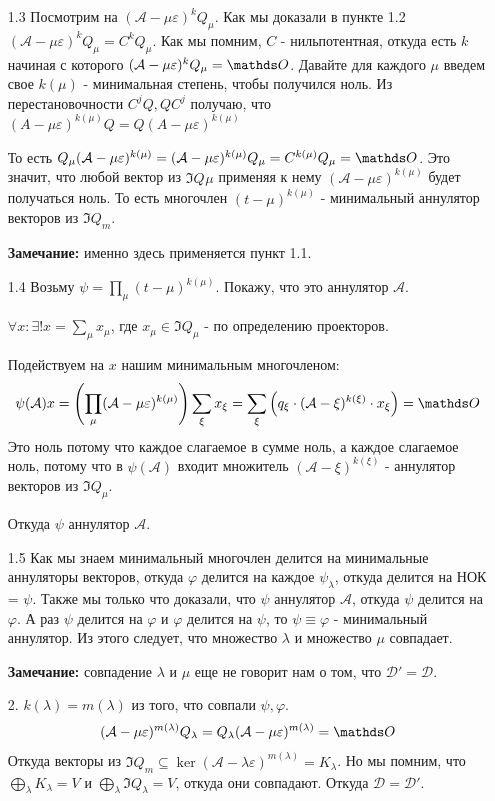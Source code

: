 \begin{enumerate}
    \item[1.3] Посмотрим на $(\mathcal{A}-\mu \varepsilon)^k Q_{\mu}$. Как мы доказали в пункте 1.2 $(\mathcal{A}-\mu \varepsilon)^k Q_{\mu}= C^{k}Q_{\mu}$. Как мы помним, $C$ - нильпотентная, откуда есть $k$ начиная с которого  $(\mathcal{A}-\mu \varepsilon)^k Q_{\mu} = \zero$. Давайте для каждого $\mu$ введем свое $k(\mu)$ - минимальная степень, чтобы получился ноль. Из перестановочности $C^jQ, QC^j$ получаю, что $(A-\mu\varepsilon)^{k(\mu)}Q =Q(A-\mu\varepsilon)^{k(\mu)} $

    То есть $Q_{\mu}(\mathcal{A}-\mu \varepsilon)^{k(\mu)} =(\mathcal{A}-\mu \varepsilon)^{k(\mu)}Q_{\mu}=C^{k(\mu)}Q_{\mu}=\zero$. Это значит, что любой вектор из $\Im Q_{}\mu$ применяя к нему $(\mathcal{A}-\mu \varepsilon)^{k(\mu)}$  будет получаться ноль.
    То есть многочлен $(t-\mu)^{k(\mu)}$ - минимальный аннулятор векторов из $\Im Q_m$.

    \textbf{Замечание:}  именно здесь применяется пункт 1.1.

    \item[1.4] Возьму $\psi = \prod\limits_{\mu}(t-\mu)^{k(\mu)}$. Покажу, что это аннулятор $\mathcal{A}$.

    $\forall x: \exists!x = \sum\limits_{\mu}x_{\mu} $, где $x_{\mu} \in \Im Q_{\mu}$ - по определению проекторов.

    Подействуем на $x$ нашим минимальным многочленом:
    $$\psi(\mathcal{A})x = \left( \prod\limits_{\mu}(\mathcal{A}-\mu \varepsilon)^{k(\mu)}\right)\sum\limits_{\xi}x_{\xi} =\sum\limits_{\xi}\left( q_{\xi}\cdot(\mathcal{A}-\xi)^{k(\xi)} \cdot x_{\xi}\right) = \zero $$
    Это ноль потому что каждое слагаемое в сумме ноль, а каждое слагаемое ноль, потому что в $\psi(\mathcal{A})$ входит множитель $(\mathcal{A}-\xi)^{k(\xi)}$ - аннулятор векторов из $\Im Q_\mu$.

    Откуда $\psi$ аннулятор $\mathcal{A}$.
    \item[1.5] Как мы знаем минимальный многочлен делится на минимальные аннуляторы векторов, откуда $\varphi $ делится на каждое $\psi_{\lambda}$, откуда делится на НОК = $\psi$. Также мы только что доказали, что $\psi$ аннулятор $\mathcal{A}$, откуда $\psi$ делится на $\varphi$. А раз  $\psi$ делится на $\varphi$ и $\varphi$ делится на $\psi$, то $\psi \equiv \varphi $ - минимальный аннулятор. Из этого следует, что множество $\lambda$ и множество $\mu$ совпадает.

    \textbf{Замечание:} совпадение  $\lambda$ и $\mu$ еще не говорит нам о том, что $\mathcal{D}' = \mathcal{D}$.
    \item[2.] $k(\lambda) = m(\lambda)$ из того, что совпали $\psi, \varphi$.
    $$(\mathcal{A}-\mu\varepsilon)^{m(\lambda)}Q_{\lambda} =Q_{\lambda}(\mathcal{A}-\mu\varepsilon)^{m(\lambda)} =\zero$$
    Откуда векторы из $\Im Q_{m} \subseteq \ker (\mathcal{A}-\lambda\varepsilon)^{m(\lambda)} = K_{\lambda}$. Но мы помним, что $\bigoplus\limits_{\lambda}K_{\lambda} = V$ и  $\bigoplus\limits_{\lambda}\Im Q_{\lambda} = V$, откуда они совпадают. Откуда $\mathcal{D} = \mathcal{D}'$.
\end{enumerate}


